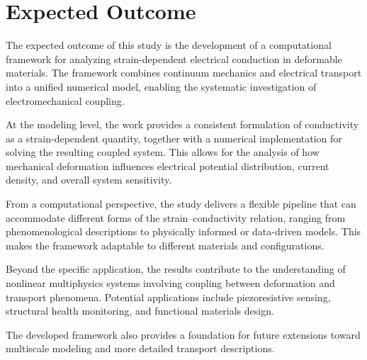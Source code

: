\section{Expected Outcome}

The expected outcome of this study is the development of a computational framework for analyzing strain-dependent electrical conduction 
in deformable materials. The framework combines continuum mechanics and electrical transport into a unified numerical model, 
enabling the systematic investigation of electromechanical coupling.

At the modeling level, the work provides a consistent formulation of conductivity as a strain-dependent quantity, 
together with a numerical implementation for solving the resulting coupled system. 
This allows for the analysis of how mechanical deformation influences electrical potential distribution, 
current density, and overall system sensitivity.

From a computational perspective, the study delivers a flexible pipeline that can accommodate different forms of the 
strain–conductivity relation, ranging from phenomenological descriptions to physically informed or data-driven models. 
This makes the framework adaptable to different materials and configurations.

Beyond the specific application, the results contribute to the understanding of nonlinear multiphysics systems 
involving coupling between deformation and transport phenomena. 
Potential applications include piezoresistive sensing, structural health monitoring, and functional materials design.

The developed framework also provides a foundation for future extensions toward multiscale modeling 
and more detailed transport descriptions.